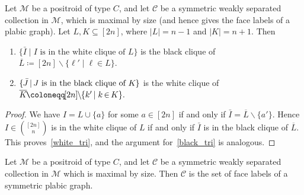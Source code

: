 \documentclass[ALCO,ThmDefs,Unicode,epreuves]{cedram}
\newcommand*{\mk}{\mkern -1mu}
\newcommand*{\Mk}{\mkern -2mu}
\begin{document}
\begin{lemm}
\label{reflect_clique}
Let $\mathcal{M}$ be a positroid of type $C$, and let $\mathcal{C}$ be a symmetric weakly separated collection in $\mathcal{M}$, which is maximal by size (and hence gives the face labels of a plabic graph).
Let $L, K \subseteq [2n]$, where $|L| = n-1$ and $|K| = n+1$.
Then
\begin{enumerate}
\item \label{white_tri}
$\{\bar{I} \mid I \text{ is in the white clique of $L$}\}$
is the black clique of 
$\overline{L} \coloneqq [2n] \backslash \{\ell' \mid \ell \in L\}.$
\item \label{black_tri}
$\{\mk \bar{J} \Mk \mid \Mk J \text{ is in the black clique of $K$}\mk\}$
is the white clique of $
\overline{K} \Mk \coloneqq \Mk [2n] \mk \backslash \mk \{k' \Mk \mid k \Mk \in \Mk K\}.$
\end{enumerate}
\end{lemm}

\begin{proof}
We have $I = L \cup \{a\}$ for some $a \in [2n]$
if and only if $\bar{I} = \overline{L} \backslash \{a'\}.$
Hence $I \in \binom{[2n]}{n}$ is in the white clique of $L$ if and only if $\bar{I}$ is in the black clique of $\overline{L}$.
This proves~\eqref{white_tri}, and the argument for~\eqref{black_tri} is analogous. \end{proof}

\begin{prop}
\label{goodtiling}
Let $\mathcal{M}$ be a positroid of type $C$, and let $\mathcal{C}$ be a symmetric weakly separated collection in $\mathcal{M}$ which is maximal by size. Then $\mathcal{C}$ is the set of face labels of a symmetric plabic graph. 
\end{prop}
\end{document}
